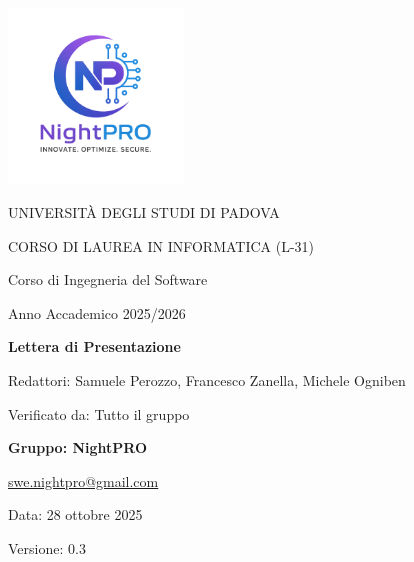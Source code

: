 \documentclass[a4paper, 11pt, oneside]{scrartcl} %
\begin{document}
\thispagestyle{empty}
\begin{titlepage}
    \centering
    \vspace*{1cm}
    \includegraphics[width=0.35\textwidth]{logo.png}\\[1cm]

     \vfill
    
    {\small UNIVERSITÀ DEGLI STUDI DI PADOVA \par}
    {\small CORSO DI LAUREA IN INFORMATICA (L-31) \par}
    \vspace{0.5cm}
    {\large Corso di Ingegneria del Software \par}
    {\small Anno Accademico 2025/2026 \par}
    \vfill
    
    {\Huge \bfseries Lettera di Presentazione \par}
        \vspace{1cm}
         {\Large Redattori: Samuele Perozzo, Francesco Zanella, Michele Ogniben\par} 
    {\Large Verificato da: Tutto il gruppo\par} 
    \vfill

    {\Large \bfseries Gruppo: NightPRO}    \vspace{0.5cm}

    {\large \href{mailto:swe.nightpro@gmail.com}{swe.nightpro@gmail.com}}\\[2cm]

        {\large Data: 28 ottobre 2025 \par}

     {\Large Versione: 0.3 \par} 

\end{titlepage}

\newpage
\pagestyle{fancy}
{}
\end{document}
